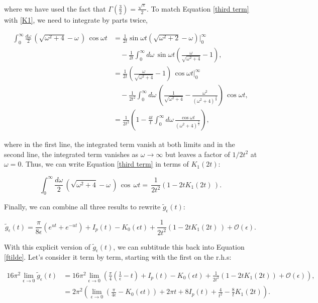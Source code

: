 \documentclass{article}
\numberwithin{equation}{section} %
\begin{document}
\noindent where we have used the fact that  $\Gamma(\frac{3}{2})=\frac{\sqrt{\pi}}{2}$. To match Equation \ref{third term} with \ref{K1}, we need to integrate by parts twice,

\begin{equation}
\begin{split}
\int^\infty_0 \frac{d\omega}{2}\, \left(\sqrt{\omega^2 + 4} - \omega\,\right)\, \cos \omega t &= \frac{1}{2t}\sin \omega t \left(\sqrt{\omega^2 +2} - \omega\right)\bigg\vert^\infty_0\\
& \quad -\frac{1}{2t}\int^\infty_0 d\omega\, \sin \omega t \left( \frac{\omega}{\sqrt{\omega^2 +4}} - 1 \right),\\
&=\frac{1}{2t}\left(\frac{\omega}{\sqrt{\omega^2+4}} -1 \right)\,\cos \omega t \bigg\vert^\infty_0 \\
& \quad -\frac{1}{2t^2} \int^\infty_0 d\omega \, \left(\frac{1}{\sqrt{\omega^2 + 4}} - \frac{\omega^2}{(\omega^2 +4)^{\frac{3}{2}}} \right) \, \cos \omega t,\\
&=\frac{1}{2t^2} \left( 1 - \frac{4t}{t} \int^\infty_0 d\omega \, \frac{\cos \omega t}{(\omega^2 + 4)^{\frac{3}{2}}} \right),
\end{split}
\end{equation}

\noindent where in the first line, the integrated term vanish at both limits and in the second line, the integrated term vanishes as $\omega\rightarrow \infty$ but leaves a factor of $1/2t^2$ at $\omega=0$. Thus, we can write Equation \ref{third term} in terms of $K_1(2t)$:

\begin{equation}
\int^\infty_0 \frac{d\omega}{2}\, \left(\sqrt{\omega^2 + 4} - \omega\,\right)\, \cos \, \omega t  = \,\frac{1}{2t^2}( 1 - 2tK_1(2t)\,).
\end{equation}

Finally, we can combine all three results to rewrite $\tilde{g}_\epsilon(t)$:

\begin{equation}
\tilde{g}_\epsilon(t) = \frac{\pi}{8\epsilon}(e^{ut}+e^{-ut}) + I_p(t) -  K_0(\epsilon t) + \frac{1}{2t^2}( 1 - 2tK_1(2t)\,) + \mathcal{O}(\epsilon).
\end{equation}

With this explicit version of $\tilde{g}_\epsilon(t)$, we can subtitude this back into Equation \ref{ftilde}. Let's consider it term by term, starting with the first on the r.h.s:

\begin{equation}
\begin{split}
16\pi^2\lim_{\epsilon \rightarrow 0} \tilde{g}_\epsilon(t) &= 16\pi^2 \lim_{\epsilon\rightarrow 0} \left( \frac{\pi}{4}(\frac{1}{\epsilon}-t) + I_p(t) - K_0(\epsilon t) + \frac{1}{2t^2}(1-2tK_1(2t)) + \mathcal{O}(\epsilon) \right),\\
&= 2\pi^2 \left( \lim_{\epsilon\rightarrow 0} \left( \frac{\pi}{4\epsilon} - K_0(\epsilon t)\right) + 2\pi t + 8I_p(t)  + \frac{4}{t^2} - \frac{8}{t}K_1(2t) \right).
\end{split}
\label{lim 1}
\end{equation}
\end{document}
